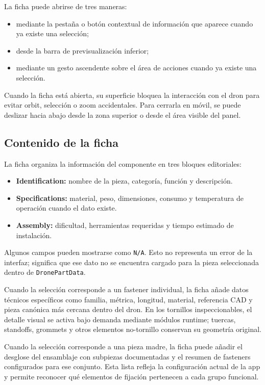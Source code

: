 \documentclass[12pt,letterpaper]{article}
\begin{document}
La ficha puede abrirse de tres maneras:
\begin{itemize}
    \item mediante la pestaña o botón contextual de información que aparece cuando ya existe una selección;
    \item desde la barra de previsualización inferior;
    \item mediante un gesto ascendente sobre el área de acciones cuando ya existe una selección.
\end{itemize}

\noindent Cuando la ficha está abierta, su superficie bloquea la interacción con el dron para evitar orbit, selección o zoom accidentales. Para cerrarla en móvil, se puede deslizar hacia abajo desde la zona superior o desde el área visible del panel.

\subsection{Contenido de la ficha}
La ficha organiza la información del componente en tres bloques editoriales:
\begin{itemize}
    \item \textbf{Identification:} nombre de la pieza, categoría, función y descripción.
    \item \textbf{Specifications:} material, peso, dimensiones, consumo y temperatura de operación cuando el dato existe.
    \item \textbf{Assembly:} dificultad, herramientas requeridas y tiempo estimado de instalación.
\end{itemize}

\noindent Algunos campos pueden mostrarse como \texttt{N/A}. Esto no representa un error de la interfaz; significa que ese dato no se encuentra cargado para la pieza seleccionada dentro de \texttt{DronePartData}.

\noindent Cuando la selección corresponde a un fastener individual, la ficha añade datos técnicos específicos como familia, métrica, longitud, material, referencia CAD y pieza canónica más cercana dentro del dron. En los tornillos inspeccionables, el detalle visual se activa bajo demanda mediante módulos runtime; tuercas, standoffs, grommets y otros elementos no-tornillo conservan su geometría original.

\noindent Cuando la selección corresponde a una pieza madre, la ficha puede añadir el desglose del ensamblaje con subpiezas documentadas y el resumen de fasteners configurados para ese conjunto. Esta lista refleja la configuración actual de la app y permite reconocer qué elementos de fijación pertenecen a cada grupo funcional.
\end{document}
